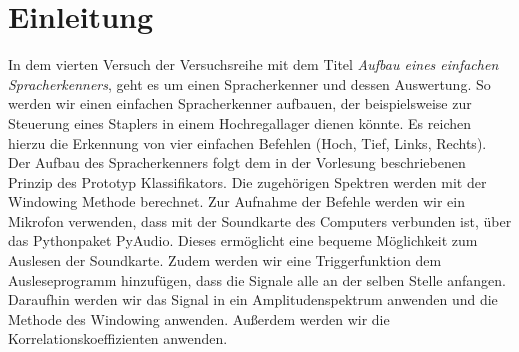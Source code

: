 \documentclass[12pt, oneside, a4paper, \docLanguage]{report}
\begin{document}

\setcounter{section}{0}



\clearpage

%
%


%
%


%
%


%
%




\setcounter{page}{1} 
\pagestyle{default}
%
%
\chapter{Einleitung}
\label{chap:EINL}

In dem vierten Versuch der Versuchsreihe mit dem Titel  \textit{Aufbau eines einfachen Spracherkenners}, geht es um einen Spracherkenner und dessen Auswertung.
\newline
So werden wir einen einfachen Spracherkenner aufbauen, der beispielsweise zur Steuerung eines Staplers in einem Hochregallager dienen könnte.
\newline
Es reichen hierzu die Erkennung von vier einfachen Befehlen (Hoch, Tief, Links, Rechts). Der Aufbau  des Spracherkenners folgt dem in der Vorlesung beschriebenen Prinzip des Prototyp Klassifikators. 
\newline
\newline
Die zugehörigen Spektren werden mit der Windowing Methode berechnet. Zur Aufnahme der Befehle werden wir ein Mikrofon verwenden, dass mit der Soundkarte des Computers verbunden ist, über das Pythonpaket PyAudio.
\newline
Dieses ermöglicht eine bequeme Möglichkeit zum Auslesen der Soundkarte.
Zudem werden wir eine Triggerfunktion dem Ausleseprogramm hinzufügen, dass die Signale alle an der selben Stelle anfangen.
\newline
Daraufhin werden wir das Signal in ein Amplitudenspektrum anwenden und die Methode des Windowing anwenden.
Außerdem werden wir die Korrelationskoeffizienten anwenden.
\end{document}
